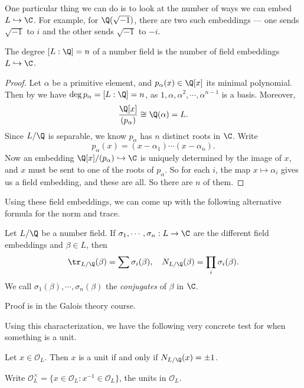 \documentclass[a4paper]{article}
\begin{document}
One particular thing we can do is to look at the number of ways we can embed $L \hookrightarrow \C$. For example, for $\Q(\sqrt{-1})$, there are two such embeddings --- one sends $\sqrt{-1}$ to $i$ and the other sends $\sqrt{-1}$ to $-i$.

\begin{lemma}
  The degree $[L:\Q] = n$ of a number field is the number of field embeddings $L \hookrightarrow \C$.
\end{lemma}

\begin{proof}
  Let $\alpha$ be a primitive element, and $p_\alpha(x) \in \Q[x]$ its minimal polynomial. Then by we have $\deg p_\alpha = [L:\Q] = n$, as $1, \alpha, \alpha^2, \cdots, \alpha^{n - 1}$ is a basis. Moreover,
  \[
    \frac{\Q[x]}{(p_\alpha)} \cong \Q(\alpha) = L.
  \]
  Since $L/\Q$ is separable, we know $p_\alpha$ has $n$ distinct roots in $\C$. Write
  \[
    p_\alpha(x) = (x - \alpha_1) \cdots (x - \alpha_n).
  \]
  Now an embedding $\Q[x]/(p_\alpha) \hookrightarrow \C$ is uniquely determined by the image of $x$, and $x$ must be sent to one of the roots of $p_\alpha$. So for each $i$, the map $x \mapsto \alpha_i$ gives us a field embedding, and these are all. So there are $n$ of them.
\end{proof}

Using these field embeddings, we can come up with the following alternative formula for the norm and trace.
\begin{cor}
  Let $L/\Q$ be a number field. If $\sigma_1, \cdots, \sigma_n:L \to \C$ are the different field embeddings and $\beta \in L$, then
  \[
    \tr_{L/\Q}(\beta) = \sum \sigma_i(\beta),\quad N_{L/\Q}(\beta) = \prod_i \sigma_i(\beta).
  \]
  We call $\sigma_1(\beta), \cdots, \sigma_n (\beta)$ the \emph{conjugates} of $\beta$ in $\C$.
\end{cor}
Proof is in the Galois theory course.

Using this characterization, we have the following very concrete test for when something is a unit.
\begin{lemma}
  Let $x \in \mathcal{O}_L$. Then $x$ is a unit if and only if $N_{L/\Q}(x) = \pm 1$.
\end{lemma}

\begin{notation}
  Write $\mathcal{O}_L^\times = \{x \in \mathcal{O}_L: x^{-1} \in \mathcal{O}_L\}$, the units in $\mathcal{O}_L$.
\end{notation}
\end{document}

